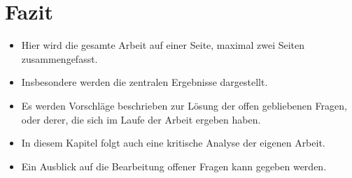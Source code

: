 
\chapter{Fazit} %
\label{Chapter5}

\begin{itemize}
  \item Hier wird die gesamte Arbeit auf einer Seite, maximal zwei Seiten zusammengefasst.
  \item Insbesondere werden die zentralen Ergebnisse dargestellt.
  \item Es werden Vorschläge beschrieben zur Lösung der offen gebliebenen Fragen, oder derer, die sich im Laufe der Arbeit ergeben haben.
  \item In diesem Kapitel folgt auch eine kritische Analyse der eigenen Arbeit.
  \item Ein Ausblick auf die Bearbeitung offener Fragen kann gegeben werden.
\end{itemize}

